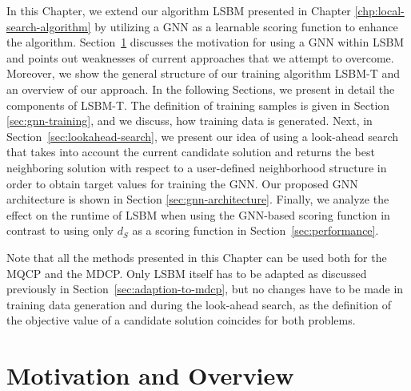 \documentclass[draft,final]{vutinfth} %
\begin{document}
In this Chapter, we extend our algorithm LSBM presented in Chapter \ref{chp:local-search-algorithm} by utilizing a GNN as a learnable scoring function to enhance the algorithm. 
Section~\ref{sec:gnn-local-search} discusses the motivation for using a GNN within LSBM and points out weaknesses of current approaches that we attempt to overcome. Moreover, we show the general structure of our training algorithm LSBM-T and an overview of our approach. 
In the following Sections, we present in detail the components of LSBM-T. The definition of training samples is given in Section \ref{sec:gnn-training}, and we discuss, how training data is generated. 
Next, in Section~\ref{sec:lookahead-search}, we present our idea of using a look-ahead search that takes into account the current candidate solution and returns the best neighboring solution with respect to a user-defined neighborhood structure in order to obtain target values for training the GNN. 
Our proposed GNN architecture is shown in Section \ref{sec:gnn-architecture}. 
Finally, we analyze the effect on the runtime of LSBM when using the GNN-based scoring function in contrast to using only $d_S$ as a scoring function in Section~\ref{sec:performance}. 

Note that all the methods presented in this Chapter can be used both for the MQCP and the MDCP. Only LSBM itself has to be adapted as discussed previously in Section~\ref{sec:adaption-to-mdcp}, but no changes have to be made in training data generation and during the look-ahead search, as the definition of the objective value of a candidate solution coincides for both problems. 

\section{Motivation and Overview}\label{sec:gnn-local-search}
\end{document}

